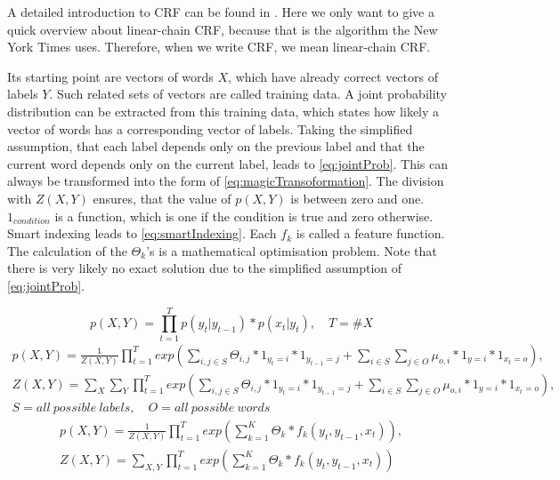 \documentclass[12pt, twoside]{report}
\begin{document}
A detailed introduction to CRF can be found in \parencite{CRFIntroduction}. Here we only want to give a quick overview about linear-chain CRF, because that is the algorithm the New York Times uses. Therefore, when we write CRF, we mean linear-chain CRF.

Its starting point are vectors of words $X$, which have already correct vectors of labels $Y$. Such related sets of vectors are called training data. A joint probability distribution can be extracted from this training data, which states how likely a vector of words has a corresponding vector of labels. Taking the simplified assumption, that each label depends only on the previous label and that the current word depends only on the current label, leads to \cref{eq:jointProb}. This can always be transformed into the form of \cref{eq:magicTransoformation}. The division with $Z(X,Y)$ ensures, that the value of $p(X,Y)$ is between zero and one. $1_{condition}$ is a function, which is one if the condition is true and zero otherwise. Smart indexing leads to \cref{eq:smartIndexing}. Each $f_k$ is called a feature function. The calculation of the $\Theta_k$'s is a mathematical optimisation problem. Note that there is very likely no exact solution due to the simplified assumption of \cref{eq:jointProb}.

\begin{equation} \label{eq:jointProb}
p(X,Y) = \prod_{t=1}^T p(y_t|y_{t-1}) * p(x_t|y_t), \quad T = \#X
\end{equation}
\begin{align}\label{eq:magicTransoformation}
p(X,Y) = \frac{1}{Z(X,Y)}\prod_{t=1}^T exp(\sum_{i,j\in S}^{} \Theta_{i,j} * 1_{y_t=i} * 1_{y_{t-1}=j} + \sum_{i \in S}^{} \sum_{j \in O}^{} \mu_{o,i} * 1_{y=i} * 1_{x_t=o}), \nonumber
\\
Z(X,Y) = \sum_{X}^{}\sum_{Y}^{}\prod_{t=1}^T exp(\sum_{i,j\in S}^{} \Theta_{i,j} * 1_{y_t=i} * 1_{y_{t-1}=j} + \sum_{i \in S}^{} \sum_{j \in O}^{} \mu_{o,i} * 1_{y=i} * 1_{x_t=o}), \nonumber
\\
S = all\ possible\ labels, \quad O = all\ possible\ words
\end{align}
\begin{align} \label{eq:smartIndexing}
p(X,Y) = \frac{1}{Z(X,Y)}\prod_{t=1}^T exp(\sum_{k=1}^{K} \Theta_{k} * f_k(y_t, y_{t-1}, x_t)), \nonumber
\\
Z(X,Y) = \sum_{X,Y}^{}\prod_{t=1}^T exp(\sum_{k=1}^{K} \Theta_{k} * f_k(y_t, y_{t-1}, x_t))
\end{align}
\end{document}
